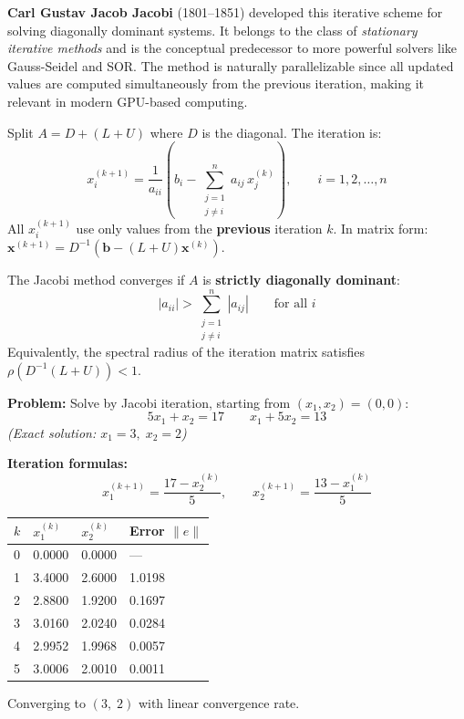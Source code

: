 \documentclass[12pt]{article}
\newcommand{\hcell}[1]{\textbf{\color{white}#1}}
\begin{document}
\vspace{10pt}

\begin{histbox}
\textbf{Carl Gustav Jacob Jacobi} (1801--1851) developed this iterative scheme for solving diagonally dominant systems. It belongs to the class of \textit{stationary iterative methods} and is the conceptual predecessor to more powerful solvers like Gauss-Seidel and SOR. The method is naturally parallelizable since all updated values are computed simultaneously from the previous iteration, making it relevant in modern GPU-based computing.
\end{histbox}

\bigskip

\begin{defbox}
Split $A = D + (L + U)$ where $D$ is the diagonal. The iteration is:
\[
  \boxed{x_i^{(k+1)} = \frac{1}{a_{ii}}\left(b_i - \sum_{\substack{j=1\\j\neq i}}^{n} a_{ij}\,x_j^{(k)}\right), \qquad i = 1, 2, \ldots, n}
\]
All $x_i^{(k+1)}$ use only values from the \textbf{previous} iteration $k$. In matrix form: $\mathbf{x}^{(k+1)} = D^{-1}(\mathbf{b} - (L+U)\mathbf{x}^{(k)})$.
\end{defbox}

\begin{thmbox}
The Jacobi method converges if $A$ is \textbf{strictly diagonally dominant}:
\[
  |a_{ii}| > \sum_{\substack{j=1\\j\neq i}}^{n}|a_{ij}| \qquad \text{for all } i
\]
Equivalently, the spectral radius of the iteration matrix satisfies $\rho(D^{-1}(L+U)) < 1$.
\end{thmbox}

\bigskip

\begin{examplebox*}
\textbf{Problem:} Solve by Jacobi iteration, starting from $(x_1,x_2)=(0,0)$:
\[
  5x_1 + x_2 = 17 \qquad x_1 + 5x_2 = 13
\]
\textit{(Exact solution: $x_1 = 3,\; x_2 = 2$)}

\textbf{Iteration formulas:}
\[
  x_1^{(k+1)} = \frac{17 - x_2^{(k)}}{5}, \qquad x_2^{(k+1)} = \frac{13 - x_1^{(k)}}{5}
\]

\begin{center}{\small
\begin{tabular}{C{1.5cm} C{3cm} C{3cm} C{4cm}}
\toprule
{}
\hcell{$k$} & \hcell{$x_1^{(k)}$} & \hcell{$x_2^{(k)}$} & \hcell{Error $\|e\|$} \\
\midrule
{}
0 & 0.0000 & 0.0000 & --- \\
1 & 3.4000 & 2.6000 & 1.0198 \\
2 & 2.8800 & 1.9200 & 0.1697 \\
3 & 3.0160 & 2.0240 & 0.0284 \\
4 & 2.9952 & 1.9968 & 0.0057 \\
5 & 3.0006 & 2.0010 & 0.0011 \\
\bottomrule
\end{tabular}
}\end{center}
Converging to $(3,\;2)$ with linear convergence rate.
\end{examplebox*}
\end{document}
